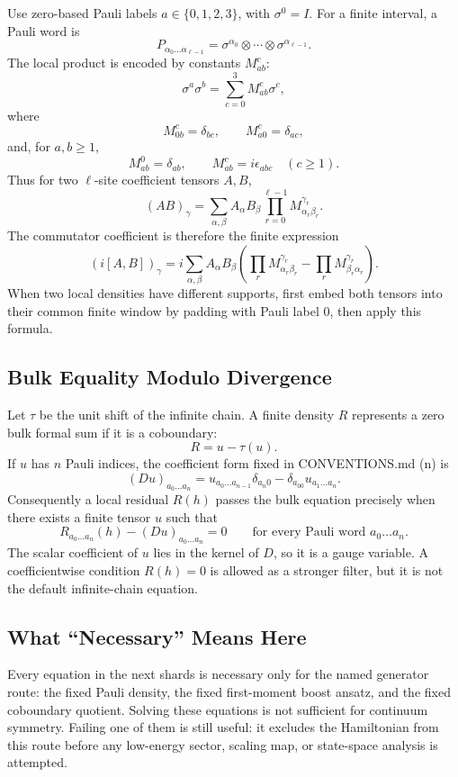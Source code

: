 Use zero-based Pauli labels \(a\in\{0,1,2,3\}\), with
\(\sigma^0=I\).  For a finite interval, a Pauli word is
\[
  P_{\alpha_0\ldots\alpha_{\ell-1}}
  =
  \sigma^{\alpha_0}\otimes\cdots\otimes\sigma^{\alpha_{\ell-1}}.
\]
The local product is encoded by constants \(M_{ab}^{c}\):
\[
  \sigma^a\sigma^b=\sum_{c=0}^3 M_{ab}^{c}\sigma^c,
\]
where
\[
  M_{0b}^{c}=\delta_{bc},\qquad
  M_{a0}^{c}=\delta_{ac},
\]
and, for \(a,b\geq1\),
\[
  M_{ab}^{0}=\delta_{ab},\qquad
  M_{ab}^{c}=i\epsilon_{abc}\quad(c\geq1).
\]
Thus for two \(\ell\)-site coefficient tensors \(A,B\),
\[
  (AB)_\gamma
  =
  \sum_{\alpha,\beta}
  A_\alpha B_\beta
  \prod_{r=0}^{\ell-1}M_{\alpha_r\beta_r}^{\gamma_r}.
\]
The commutator coefficient is therefore the finite expression
\[
  (i[A,B])_\gamma
  =
  i\sum_{\alpha,\beta}A_\alpha B_\beta
  \left(
  \prod_rM_{\alpha_r\beta_r}^{\gamma_r}
  -
  \prod_rM_{\beta_r\alpha_r}^{\gamma_r}
  \right).
\]
When two local densities have different supports, first embed both tensors into
their common finite window by padding with Pauli label \(0\), then apply this
formula.

\subsection{Bulk Equality Modulo Divergence}

Let \(\tau\) be the unit shift of the infinite chain.  A finite density \(R\)
represents a zero bulk formal sum if it is a coboundary:
\[
  R=u-\tau(u).
\]
If \(u\) has \(n\) Pauli indices, the coefficient form fixed in CONVENTIONS.md
(n) is
\[
  (D u)_{a_0\ldots a_n}
  =
  u_{a_0\ldots a_{n-1}}\delta_{a_n0}
  -
  \delta_{a_00}u_{a_1\ldots a_n}.
  \tag{38.1}
\]
Consequently a local residual \(R(h)\) passes the bulk equation precisely when
there exists a finite tensor \(u\) such that
\[
  R_{a_0\ldots a_n}(h)-(D u)_{a_0\ldots a_n}=0
  \qquad
  \text{for every Pauli word }a_0\ldots a_n .
  \tag{38.2}
\]
The scalar coefficient of \(u\) lies in the kernel of \(D\), so it is a gauge
variable.  A coefficientwise condition \(R(h)=0\) is allowed as a stronger
filter, but it is not the default infinite-chain equation.

\subsection{What ``Necessary'' Means Here}

Every equation in the next shards is necessary only for the named generator
route: the fixed Pauli density, the fixed first-moment boost ansatz, and the
fixed coboundary quotient.  Solving these equations is not sufficient for
continuum symmetry.  Failing one of them is still useful: it excludes the
Hamiltonian from this route before any low-energy sector, scaling map, or
state-space analysis is attempted.

